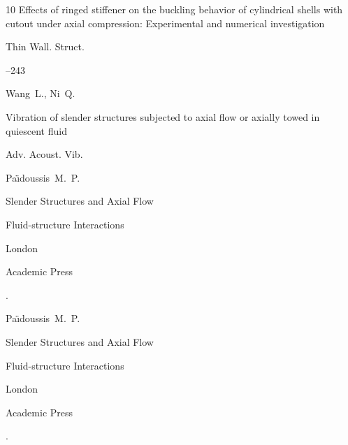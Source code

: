 \begin{thebibliography}{10}
\paper Effects of ringed stiffener on the buckling behavior of cylindrical shells with cutout under axial compression: Experimental and numerical investigation

\jour Thin Wall. Struct.



--243






\by Wang~L., Ni~Q.

\paper Vibration of slender structures subjected to axial flow or axially towed in quiescent fluid

\jour Adv. Acoust. Vib.








\by Pa\"{\i}doussis~M.~P.

\book Slender Structures and Axial Flow

\serial Fluid-structure Interactions


\publaddr London

\publ Academic Press



\moreref 

. \nofrills




\by Pa\"{\i}doussis~M.~P.

\book  Slender Structures and Axial Flow


\serial Fluid-structure Interactions

\publaddr London

\publ Academic Press



\moreref 

. \nofrills




\end{thebibliography}
